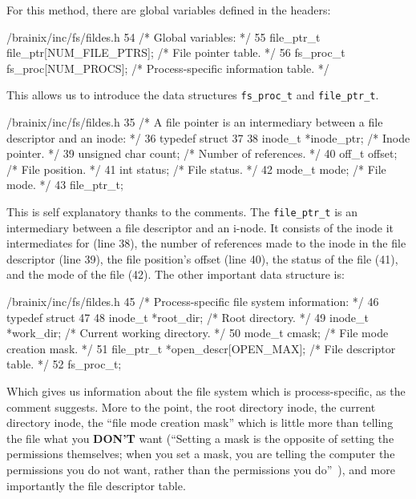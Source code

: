 \documentclass{article}
\begin{document}
For this method, there are global variables defined in the headers:
\begin{code}{/brainix/inc/fs/fildes.h}
54 /* Global variables: */
55 file_ptr_t file_ptr[NUM_FILE_PTRS]; /* File pointer table.                 */
56 fs_proc_t fs_proc[NUM_PROCS];       /* Process-specific information table. */
\end{code}
This allows us to introduce the data structures \verb|fs_proc_t| and \verb|file_ptr_t|. 
\begin{code}{/brainix/inc/fs/fildes.h}
35 /* A file pointer is an intermediary between a file descriptor and an inode: */
36 typedef struct
37 {
38      inode_t *inode_ptr;  /* Inode pointer.        */
39      unsigned char count; /* Number of references. */
40      off_t offset;        /* File position.        */
41      int status;          /* File status.          */
42      mode_t mode;         /* File mode.            */
43 } file_ptr_t;
\end{code}
This is self explanatory thanks to the comments. The \verb|file_ptr_t| is an intermediary between a file descriptor and an i-node. It consists of the inode it intermediates for (line 38), the number of references made to the inode in the file descriptor (line 39), the file position's offset (line 40), the status of the file (41), and the mode of the file (42). The other important data structure is:\marginpar[fs\_proc\_t]{}
\begin{code}{/brainix/inc/fs/fildes.h}
45 /* Process-specific file system information: */
46 typedef struct
47 {
48      inode_t *root_dir;                /* Root directory.            */
49      inode_t *work_dir;                /* Current working directory. */
50      mode_t cmask;                     /* File mode creation mask.   */
51      file_ptr_t *open_descr[OPEN_MAX]; /* File descriptor table.     */
52 } fs_proc_t;
\end{code}
Which gives us information about the file system which is process-specific, as the comment suggests. More to the point, the root directory inode, the current directory inode, the ``file mode creation mask'' which is little more than telling the file what you \textbf{DON'T} want (``Setting a mask is the opposite of setting the permissions themselves; when you set a mask, you are telling the computer the permissions you do not want, rather than the permissions you do''~\cite{9}), and more importantly the file descriptor table.
\end{document}
